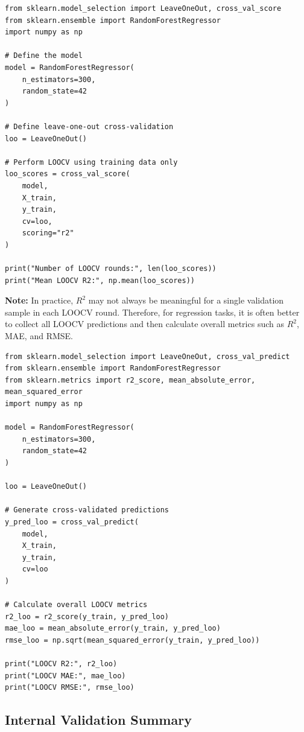 \documentclass[11pt]{report}
\newenvironment{Important note}{\begin{quote}\color{red}\textbf{Important note:} }{\end{quote}}
\begin{document}
\begin{lstlisting}[style=pythonstyle, caption={Example of leave-one-out cross-validation.}]
from sklearn.model_selection import LeaveOneOut, cross_val_score
from sklearn.ensemble import RandomForestRegressor
import numpy as np

# Define the model
model = RandomForestRegressor(
    n_estimators=300,
    random_state=42
)

# Define leave-one-out cross-validation
loo = LeaveOneOut()

# Perform LOOCV using training data only
loo_scores = cross_val_score(
    model,
    X_train,
    y_train,
    cv=loo,
    scoring="r2"
)

print("Number of LOOCV rounds:", len(loo_scores))
print("Mean LOOCV R2:", np.mean(loo_scores))
\end{lstlisting}

\textbf{Note:} In practice, $R^2$ may not always be meaningful for a single validation sample in each LOOCV round. Therefore, for regression tasks, it is often better to collect all LOOCV predictions and then calculate overall metrics such as $R^2$, MAE, and RMSE.

\begin{lstlisting}[style=pythonstyle, caption={LOOCV predictions followed by overall regression metrics.}]
from sklearn.model_selection import LeaveOneOut, cross_val_predict
from sklearn.ensemble import RandomForestRegressor
from sklearn.metrics import r2_score, mean_absolute_error, mean_squared_error
import numpy as np

model = RandomForestRegressor(
    n_estimators=300,
    random_state=42
)

loo = LeaveOneOut()

# Generate cross-validated predictions
y_pred_loo = cross_val_predict(
    model,
    X_train,
    y_train,
    cv=loo
)

# Calculate overall LOOCV metrics
r2_loo = r2_score(y_train, y_pred_loo)
mae_loo = mean_absolute_error(y_train, y_pred_loo)
rmse_loo = np.sqrt(mean_squared_error(y_train, y_pred_loo))

print("LOOCV R2:", r2_loo)
print("LOOCV MAE:", mae_loo)
print("LOOCV RMSE:", rmse_loo)
\end{lstlisting}

\subsection{Internal Validation Summary}
\end{document}

